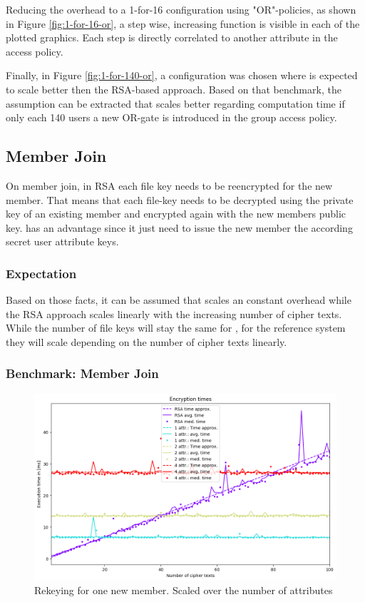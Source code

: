 Reducing the overhead to a 1-for-16 configuration using "OR"-policies, as shown in Figure \ref{fig:1-for-16-or}, a step wise, increasing function is visible in each of the plotted graphics. Each step is directly correlated to another attribute in the access policy.

Finally, in Figure \ref{fig:1-for-140-or}, a configuration was chosen where \name is expected to scale better then the RSA-based approach. Based on that benchmark, the assumption can be extracted that \name scales better regarding computation time if only each 140 users a new OR-gate is introduced in the group access policy.  

\subsection{Member Join}
On member join, in RSA each file key needs to be reencrypted for the new member. That means that each file-key needs to be decrypted using the private key of an existing member and encrypted again with the new members public key. \name has an advantage since it just need to issue the new member the according secret user attribute keys. 

\subsubsection{Expectation}
Based on those facts, it can be assumed that \name scales an constant overhead while the RSA approach scales linearly with the increasing number of cipher texts. While the number of file keys will stay the same for \name, for the reference system they will scale depending on the number of cipher texts linearly. 

\subsubsection{Benchmark: Member Join}
\begin{figure}[!ht]
\centering
    \includegraphics[width=\linewidth]{img/eval-join/join_attr_1.png}
    \caption{Rekeying for one new member. Scaled over the number of attributes}
    \label{fig:member-join}
\end{figure}

